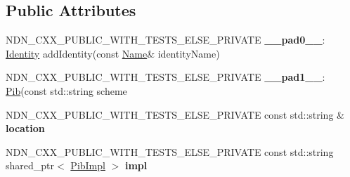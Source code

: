 \subsection*{Public Attributes}
\begin{DoxyCompactItemize}
\item 
N\+D\+N\+\_\+\+C\+X\+X\+\_\+\+P\+U\+B\+L\+I\+C\+\_\+\+W\+I\+T\+H\+\_\+\+T\+E\+S\+T\+S\+\_\+\+E\+L\+S\+E\+\_\+\+P\+R\+I\+V\+A\+TE {\bfseries \+\_\+\+\_\+pad0\+\_\+\+\_\+}\+: \hyperlink{classndn_1_1security_1_1Identity}{Identity} add\+Identity(const \hyperlink{classndn_1_1Name}{Name}\& identity\+Name)\hypertarget{classndn_1_1security_1_1Pib_abc713ee536b7ed408b71ce4c9d3455ce}{}\label{classndn_1_1security_1_1Pib_abc713ee536b7ed408b71ce4c9d3455ce}

\item 
N\+D\+N\+\_\+\+C\+X\+X\+\_\+\+P\+U\+B\+L\+I\+C\+\_\+\+W\+I\+T\+H\+\_\+\+T\+E\+S\+T\+S\+\_\+\+E\+L\+S\+E\+\_\+\+P\+R\+I\+V\+A\+TE {\bfseries \+\_\+\+\_\+pad1\+\_\+\+\_\+}\+: \hyperlink{classndn_1_1security_1_1Pib}{Pib}(const std\+::string scheme\hypertarget{classndn_1_1security_1_1Pib_a286ab77cf3acc46aac8a373b96281e12}{}\label{classndn_1_1security_1_1Pib_a286ab77cf3acc46aac8a373b96281e12}

\item 
N\+D\+N\+\_\+\+C\+X\+X\+\_\+\+P\+U\+B\+L\+I\+C\+\_\+\+W\+I\+T\+H\+\_\+\+T\+E\+S\+T\+S\+\_\+\+E\+L\+S\+E\+\_\+\+P\+R\+I\+V\+A\+TE const std\+::string \& {\bfseries location}\hypertarget{classndn_1_1security_1_1Pib_a5d5d884588f0e3e62734efcd64b2eeaf}{}\label{classndn_1_1security_1_1Pib_a5d5d884588f0e3e62734efcd64b2eeaf}

\item 
N\+D\+N\+\_\+\+C\+X\+X\+\_\+\+P\+U\+B\+L\+I\+C\+\_\+\+W\+I\+T\+H\+\_\+\+T\+E\+S\+T\+S\+\_\+\+E\+L\+S\+E\+\_\+\+P\+R\+I\+V\+A\+TE const std\+::string shared\+\_\+ptr$<$ \hyperlink{classndn_1_1security_1_1PibImpl}{Pib\+Impl} $>$ {\bfseries impl}\hypertarget{classndn_1_1security_1_1Pib_ac423c299c750a0e4ada9030b07766fa8}{}\label{classndn_1_1security_1_1Pib_ac423c299c750a0e4ada9030b07766fa8}

\end{DoxyCompactItemize}
